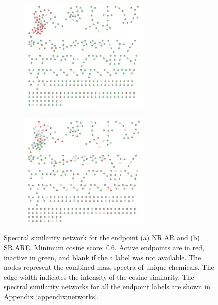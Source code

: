 \begin{figure}[H]
  \centering
	 \begin{subfigure}[a]{1\textwidth}
 		 \centering
  		\includegraphics[width=0.7\textwidth]{include/img/appendix/nets_endpoints/NR.AR.pdf}
 		 \caption{}
 	\end{subfigure}
 	\hfill
 		 \begin{subfigure}[a]{1\textwidth}
 		 \centering
 		 \includegraphics[width=0.7\textwidth]{include/img/appendix/nets_endpoints/SR.ARE.pdf}
 		 \caption{}
 	\end{subfigure}
  \caption{Spectral similarity network for the endpoint (a) NR.AR and (b) SR.ARE. Minimum cosine score: 0.6. Active endpoints are in red, inactive in green, and blank if the a label was not available. The nodes represent the combined mass spectra of unique chemicals. The edge width indicates the intensity of the cosine similarity. The spectral similarity networks for all the endpoint labels are shown in Appendix \ref{appendix:networks}.}
  \label{fig:networks}
\end{figure}






